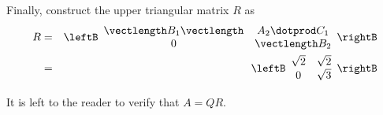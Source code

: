 \begin{solution}
Finally, construct the upper triangular matrix $R$ as 
\begin{eqnarray*}
R &=& 
\leftB
\begin{array}{cc}
\vectlength B_1 \vectlength & A_2 \dotprod C_1  \\
0 & \vectlength B_2 
\end{array}
\rightB \\
&=& 
\leftB
\begin{array}{cc}
\sqrt{2} & \sqrt{2} \\
0 & \sqrt{3} \\
\end{array}
\rightB
\end{eqnarray*}

It is left to the reader to verify that $A=QR$. 
\end{solution}
